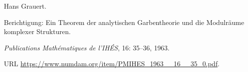 Hans Grauert.

\newblock Berichtigung: Ein Theorem der analytischen Garbentheorie und die
  Modulräume komplexer Strukturen.

\newblock \emph{Publications Mathématiques de l'IHÉS}, 16: 35--36,
  1963.

\newblock URL \url{https://www.numdam.org/item/PMIHES_1963__16__35_0.pdf}.
